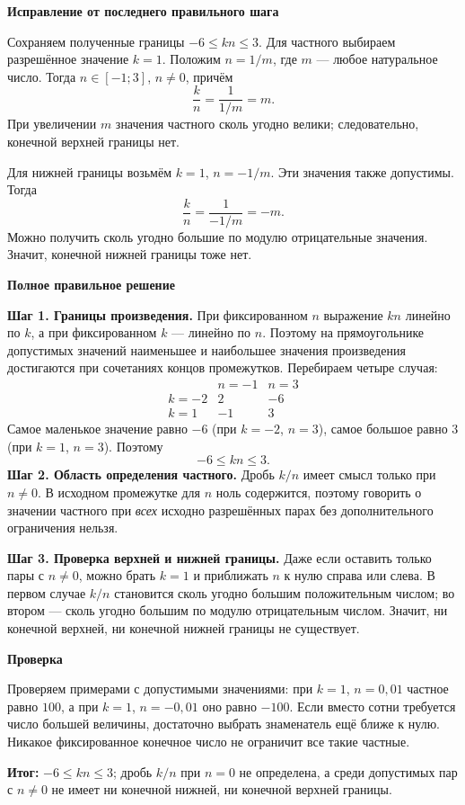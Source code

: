 \documentclass[12pt,a4paper]{article}
\newcommand{\result}{\textcolor{teal!60!black}{\textbf{Итог:}}}
\newcommand{\reviewhead}[1]{\medskip\textbf{#1}\par}
\begin{document}
\reviewhead{Исправление от последнего правильного шага}
Сохраняем полученные границы $-6\le kn\le3$. Для частного выбираем разрешённое значение $k=1$. Положим $n=1/m$, где $m$ --- любое натуральное число. Тогда $n\in[-1;3]$, $n\ne0$, причём
\[
\frac{k}{n}=\frac{1}{1/m}=m.
\]
При увеличении $m$ значения частного сколь угодно велики; следовательно, конечной верхней границы нет.

Для нижней границы возьмём $k=1$, $n=-1/m$. Эти значения также допустимы. Тогда
\[
\frac{k}{n}=\frac{1}{-1/m}=-m.
\]
Можно получить сколь угодно большие по модулю отрицательные значения. Значит, конечной нижней границы тоже нет.

\reviewhead{Полное правильное решение}
\textbf{Шаг 1. Границы произведения.} При фиксированном $n$ выражение $kn$ линейно по $k$, а при фиксированном $k$ --- линейно по $n$. Поэтому на прямоугольнике допустимых значений наименьшее и наибольшее значения произведения достигаются при сочетаниях концов промежутков. Перебираем четыре случая:
\[
\begin{array}{c|cc}
 & n=-1 & n=3\\ \hline
k=-2 & 2 & -6\\
k=1 & -1 & 3
\end{array}
\]
Самое маленькое значение равно $-6$ (при $k=-2$, $n=3$), самое большое равно $3$ (при $k=1$, $n=3$). Поэтому
\[
\boxed{-6\le kn\le3}.
\]
\textbf{Шаг 2. Область определения частного.} Дробь $k/n$ имеет смысл только при $n\ne0$. В исходном промежутке для $n$ ноль содержится, поэтому говорить о значении частного при \emph{всех} исходно разрешённых парах без дополнительного ограничения нельзя.

\textbf{Шаг 3. Проверка верхней и нижней границы.} Даже если оставить только пары с $n\ne0$, можно брать $k=1$ и приближать $n$ к нулю справа или слева. В первом случае $k/n$ становится сколь угодно большим положительным числом; во втором --- сколь угодно большим по модулю отрицательным числом. Значит, ни конечной верхней, ни конечной нижней границы не существует.

\reviewhead{Проверка}
Проверяем примерами с допустимыми значениями: при $k=1$, $n=0{,}01$ частное равно $100$, а при $k=1$, $n=-0{,}01$ оно равно $-100$. Если вместо сотни требуется число большей величины, достаточно выбрать знаменатель ещё ближе к нулю. Никакое фиксированное конечное число не ограничит все такие частные.

\result{} $-6\le kn\le3$; дробь $k/n$ при $n=0$ не определена, а среди допустимых пар с $n\ne0$ не имеет ни конечной нижней, ни конечной верхней границы.
\end{document}
